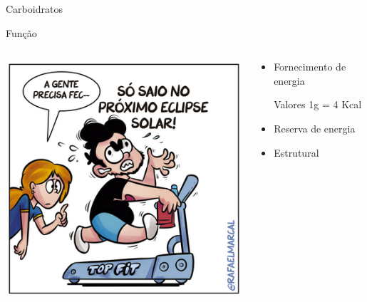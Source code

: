 \documentclass[presentation]{beamer}
\begin{document}
\begin{frame}[label={sec:org524b6ef}]{Carboidratos}
\begin{block}{Função}
\begin{columns}
\begin{column}{0.45\columnwidth}
\begin{block}{}
\begin{center}
\includegraphics[width=.9\linewidth]{./esteira.png}
\end{center}
\end{block}
\end{column}


\begin{column}{0.45\columnwidth}
\begin{block}{}
\begin{itemize}
\item Fornecimento de energia
\begin{bclogo}{Valores}
1g = 4 Kcal 
\end{bclogo}
\item Reserva de energia
\item Estrutural


\end{itemize}
\end{block}
\end{column}
\end{columns}
\end{block}
\end{frame}
\end{document}
